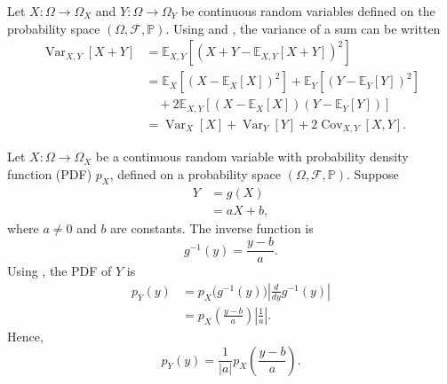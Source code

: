 \begin{example}
	Let $X\colon \Omega \to \Omega_X$ and $Y\colon\Omega \to \Omega_Y$ be continuous random variables defined on the probability space $(\Omega, \mathcal{F}, \mathbb{P})$. Using  and , the variance of a sum can be written
	\begin{equation}
		\begin{split}
			\operatorname{Var}_{X,Y}[X+Y] &= \mathbb{E}_{X,Y}[(X+Y-\mathbb{E}_{X,Y}[X+Y])^2]\\
			&= \mathbb{E}_X[(X-\mathbb{E}_X[X])^2]+\mathbb{E}_Y[(Y-\mathbb{E}_Y[Y])^2]\\
			&\quad+2\mathbb{E}_{X,Y}[(X-\mathbb{E}_X[X])(Y-\mathbb{E}_Y[Y])]\\
			& = \operatorname{Var}_X[X]+\operatorname{Var}_Y[Y]+2\operatorname{Cov}_{X,Y}[X,Y].
		\end{split}
	\end{equation}
\end{example}

\begin{example}
	Let $X\colon \Omega \to \Omega_X$ be a continuous random variable with probability density function (PDF) $p_X$, defined on a probability space $(\Omega, \mathcal{F}, \mathbb{P})$. Suppose 
	\begin{equation}
		\begin{split}
			Y &= g(X)\\ 
			&= aX + b,
		\end{split}
	\end{equation}
	where $a \neq 0$ and $b$ are constants. The inverse function is
	\begin{equation}
		g^{-1}(y) = \frac{y - b}{a}.
	\end{equation}
	Using , the PDF of $Y$ is
	\begin{equation}
		\begin{split}
			p_Y(y) &= p_X\bigl(g^{-1}(y)\bigr) \left| \frac{d}{dy} g^{-1}(y) \right| \\
			&= p_X\left(\frac{y - b}{a}\right) \left| \frac{1}{a} \right|.
		\end{split}
	\end{equation}
	Hence,
	\begin{equation}
		p_Y(y) = \frac{1}{|a|} p_X\left(\frac{y - b}{a}\right).
	\end{equation}
\end{example}

